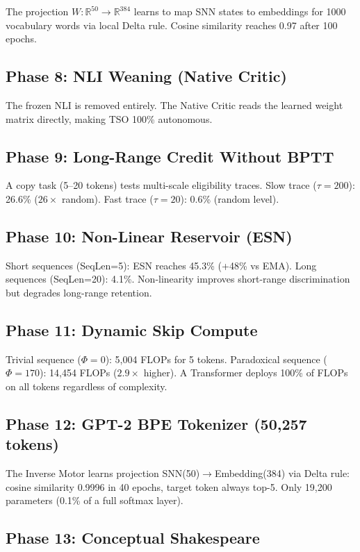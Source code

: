 \documentclass{article}
\begin{document}
The projection $W: \mathbb{R}^{50} \rightarrow \mathbb{R}^{384}$ learns to map SNN states to embeddings for 1000 vocabulary words via local Delta rule. Cosine similarity reaches 0.97 after 100 epochs.

\subsection{Phase 8: NLI Weaning (Native Critic)}

The frozen NLI is removed entirely. The Native Critic reads the learned weight matrix directly, making TSO 100\% autonomous.

\subsection{Phase 9: Long-Range Credit Without BPTT}

A copy task (5--20 tokens) tests multi-scale eligibility traces. Slow trace ($\tau=200$): 26.6\% ($26\times$ random). Fast trace ($\tau=20$): 0.6\% (random level).

\subsection{Phase 10: Non-Linear Reservoir (ESN)}

Short sequences (SeqLen=5): ESN reaches 45.3\% (+48\% vs EMA). Long sequences (SeqLen=20): 4.1\%. Non-linearity improves short-range discrimination but degrades long-range retention.

\subsection{Phase 11: Dynamic Skip Compute}

Trivial sequence ($\Phi=0$): 5,004 FLOPs for 5 tokens. Paradoxical sequence ($\Phi=170$): 14,454 FLOPs ($2.9\times$ higher). A Transformer deploys 100\% of FLOPs on all tokens regardless of complexity.

\subsection{Phase 12: GPT-2 BPE Tokenizer (50,257 tokens)}

The Inverse Motor learns projection SNN(50)$\rightarrow$Embedding(384) via Delta rule: cosine similarity 0.9996 in 40 epochs, target token always top-5. Only 19,200 parameters (0.1\% of a full softmax layer).

\subsection{Phase 13: Conceptual Shakespeare}
\end{document}
